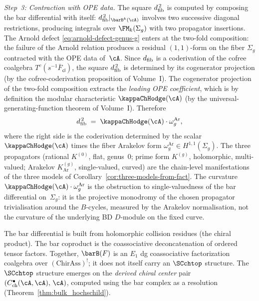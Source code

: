 \begin{construction}
\begin{enumerate}[label=\textup{(\roman*)}]
 \smallskip\noindent
 \emph{Step~3: Contraction with OPE data.}
 The square $d_{\mathrm{fib}}^{\,2}$ is computed by composing the bar
 differential with itself: $\dfib^{\,2}|_{\barB^k(\cA)}$
 involves two successive diagonal restrictions, producing
 integrals over $\FM_k(\Sigma_g)$ with two propagator
 insertions. The Arnold defect \eqref{eq:arnold-defect-genus-g}
 enters at the two-fold composition: the failure of the
 Arnold relation produces a residual $(1,1)$-form on the
 fiber $\Sigma_g$ contracted with the OPE data of~$\cA$.
 Since $d_{\mathrm{fib}}$ is a coderivation of the cofree coalgebra
 $T^c(s^{-1}\bar{F}_{\mathsf{cl}})$, the square
 $d_{\mathrm{fib}}^{\,2}$ is determined by its cogenerator projection
 \textup{(}by the cofree-coderivation proposition of
 Volume~I\textup{)}.
 The cogenerator projection of the two-fold composition
 extracts the \emph{leading OPE coefficient}, which is by
 definition the modular characteristic $\kappaChHodge(\cA)$
 \textup{(}by the universal-generating-function theorem of
 Volume~I\textup{)}.
 Therefore
 \[
 \dfib^{\,2}
 \;=\;
 \kappaChHodge(\cA) \cdot \omega_g^{\mathrm{Ar}},
 \]
 where the right side is the coderivation determined by the
scalar $\kappaChHodge(\cA)$ times the fiber Arakelov form
$\omega_g^{\mathrm{Ar}} \in H^{1,1}(\Sigma_g)$.
 The three propagators (rational $K^{(0)}$, flat,
 genus~$0$; prime form $K^{(g)}$, holomorphic, multi-valued;
 Arakelov $K^{(g)}_{\mathrm{Ar}}$, single-valued, curved)
 are the chain-level manifestations of the three models of
 Corollary~\ref{cor:three-models-from-fact}. The curvature
 $\kappaChHodge(\cA) \cdot \omega_g^{\mathrm{Ar}}$ is the obstruction to
 single-valuedness of the bar differential on~$\Sigma_g$:
 it is the projective monodromy of the chosen propagator
 trivialisation around the $B$-cycles, measured by the Arakelov
 normalisation, not the curvature of the underlying BD
 $D$-module on the fixed curve.
\end{enumerate}
The bar differential is built from holomorphic collision residues
(the chiral product).
The bar coproduct is the coassociative deconcatenation of ordered
tensor factors. Together,
$\barB(F)$ is an $E_1$ dg coassociative factorization coalgebra
over $(\mathrm{ChirAss})^!$; it does not itself carry an
$\SCchtop$ structure. The $\SCchtop$ structure emerges on the
\emph{derived chiral center} pair
$(C^\bullet_{\mathrm{ch}}(\cA,\cA),\, \cA)$, computed using the
bar complex as a resolution
(Theorem~\ref{thm:bulk_hochschild}).
\end{construction}

